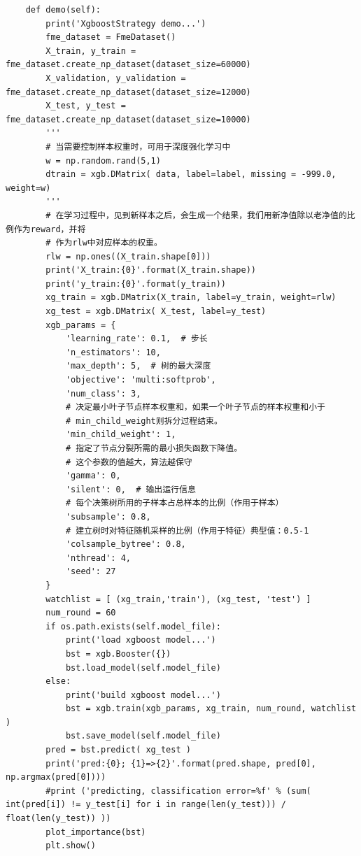 \documentclass{article}
\begin{document}
\begin{lstlisting}
    def demo(self):
        print('XgboostStrategy demo...')
        fme_dataset = FmeDataset()
        X_train, y_train = fme_dataset.create_np_dataset(dataset_size=60000)
        X_validation, y_validation = fme_dataset.create_np_dataset(dataset_size=12000)
        X_test, y_test = fme_dataset.create_np_dataset(dataset_size=10000)
        '''
        # 当需要控制样本权重时，可用于深度强化学习中
        w = np.random.rand(5,1)
        dtrain = xgb.DMatrix( data, label=label, missing = -999.0, weight=w)
        '''
        # 在学习过程中，见到新样本之后，会生成一个结果，我们用新净值除以老净值的比例作为reward，并将
        # 作为rlw中对应样本的权重。
        rlw = np.ones((X_train.shape[0]))
        print('X_train:{0}'.format(X_train.shape))
        print('y_train:{0}'.format(y_train))
        xg_train = xgb.DMatrix(X_train, label=y_train, weight=rlw)
        xg_test = xgb.DMatrix( X_test, label=y_test)
        xgb_params = {
            'learning_rate': 0.1,  # 步长
            'n_estimators': 10,
            'max_depth': 5,  # 树的最大深度
            'objective': 'multi:softprob',
            'num_class': 3,
            # 决定最小叶子节点样本权重和，如果一个叶子节点的样本权重和小于
            # min_child_weight则拆分过程结束。
            'min_child_weight': 1, 
            # 指定了节点分裂所需的最小损失函数下降值。
            # 这个参数的值越大，算法越保守 
            'gamma': 0,  
            'silent': 0,  # 输出运行信息
            # 每个决策树所用的子样本占总样本的比例（作用于样本）
            'subsample': 0.8,  
            # 建立树时对特征随机采样的比例（作用于特征）典型值：0.5-1
            'colsample_bytree': 0.8,  
            'nthread': 4,
            'seed': 27
        }
        watchlist = [ (xg_train,'train'), (xg_test, 'test') ]
        num_round = 60
        if os.path.exists(self.model_file):
            print('load xgboost model...')
            bst = xgb.Booster({})
            bst.load_model(self.model_file)
        else:
            print('build xgboost model...')
            bst = xgb.train(xgb_params, xg_train, num_round, watchlist )
            bst.save_model(self.model_file)
        pred = bst.predict( xg_test )
        print('pred:{0}; {1}=>{2}'.format(pred.shape, pred[0], np.argmax(pred[0])))
        #print ('predicting, classification error=%f' % (sum( int(pred[i]) != y_test[i] for i in range(len(y_test))) / float(len(y_test)) ))
        plot_importance(bst)
        plt.show()
\end{lstlisting}
\end{document}
